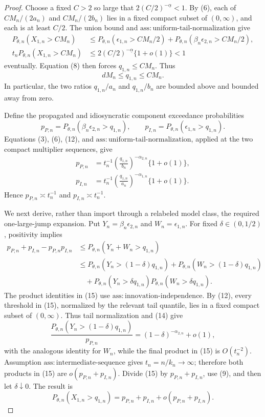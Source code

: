 \documentclass{article}
\begin{document}
\begin{proof}
Choose a fixed \(C>2\) so large that
\(2(C/2)^{-\underline\alpha}<1\). By (6), each of
\(CM_n/(2a_n)\) and \(CM_n/(2b_n)\) lies in a fixed compact subset of
\((0,\infty)\), and each is at least \(C/2\). The union bound and
\(\mathrm{ass{:}uniform\text{-}tail\text{-}normalization}\) give
\[
\begin{aligned}
P_{\theta,n}(X_{1,n}>CM_n)
&\leq P_{\theta,n}(\epsilon_{1,n}>CM_n/2)
+P_{\theta,n}(\beta_n\epsilon_{2,n}>CM_n/2),\\
t_nP_{\theta,n}(X_{1,n}>CM_n)
&\leq2(C/2)^{-\underline\alpha}\{1+o(1)\}<1
\end{aligned}
\tag{11}
\]
eventually. Equation (8) then forces \(q_{1,n}\leq CM_n\). Thus
\[
dM_n\leq q_{1,n}\leq CM_n.
\tag{12}
\]
In particular, the two ratios \(q_{1,n}/a_n\) and \(q_{1,n}/b_n\) are
bounded above and bounded away from zero.

Define the propagated and idiosyncratic component exceedance probabilities
\[
p_{P,n}=P_{\theta,n}(\beta_n\epsilon_{2,n}>q_{1,n}),
\qquad
p_{I,n}=P_{\theta,n}(\epsilon_{1,n}>q_{1,n}).
\tag{13}
\]
Equations (3), (6), (12), and
\(\mathrm{ass{:}uniform\text{-}tail\text{-}normalization}\), applied at the
two compact multiplier sequences, give
\[
\begin{aligned}
p_{P,n}
&=t_n^{-1}\left(\frac{q_{1,n}}{b_n}\right)^{-\alpha_{2,n}}
\{1+o(1)\},\\
p_{I,n}
&=t_n^{-1}\left(\frac{q_{1,n}}{a_n}\right)^{-\alpha_{1,n}}
\{1+o(1)\}.
\end{aligned}
\tag{14}
\]
Hence \(p_{P,n}\asymp t_n^{-1}\) and \(p_{I,n}\asymp t_n^{-1}\).

We next derive, rather than import through a relabeled model class, the required
one-large-jump expansion. Put \(Y_n=\beta_n\epsilon_{2,n}\) and
\(W_n=\epsilon_{1,n}\). For fixed \(\delta\in(0,1/2)\), positivity implies
\[
\begin{aligned}
p_{P,n}+p_{I,n}-p_{P,n}p_{I,n}
&\leq P_{\theta,n}(Y_n+W_n>q_{1,n})\\
&\leq P_{\theta,n}(Y_n>(1-\delta)q_{1,n})
+P_{\theta,n}(W_n>(1-\delta)q_{1,n})\\
&\quad+P_{\theta,n}(Y_n>\delta q_{1,n})
P_{\theta,n}(W_n>\delta q_{1,n}).
\end{aligned}
\tag{15}
\]
The product identities in (15) use
\(\mathrm{ass{:}innovation\text{-}independence}\). By (12), every threshold
in (15), normalized by the relevant tail quantile, lies in a fixed compact
subset of \((0,\infty)\). Thus tail normalization and (14) give
\[
\frac{P_{\theta,n}(Y_n>(1-\delta)q_{1,n})}{p_{P,n}}
=(1-\delta)^{-\alpha_{2,n}}+o(1),
\tag{16}
\]
with the analogous identity for \(W_n\), while the final product in (15) is
\(O(t_n^{-2})\). Assumption \(\mathrm{ass{:}intermediate\text{-}sequence}\)
gives \(t_n=n/k_n\to\infty\); therefore both products in (15) are
\(o(p_{P,n}+p_{I,n})\). Divide (15) by \(p_{P,n}+p_{I,n}\), use (9), and
then let \(\delta\downarrow0\). The result is
\[
P_{\theta,n}(X_{1,n}>q_{1,n})
=p_{P,n}+p_{I,n}+o(p_{P,n}+p_{I,n}).
\tag{17}
\]


\end{proof}
\end{document}
